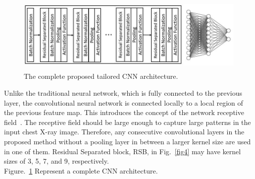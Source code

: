 \begin{figure}
    \begin{center}
    \includegraphics[height=37mm,width=14.0cm]{Figures/fig5.jpg}
    \caption{The complete proposed tailored CNN architecture.}
    \label{fig52}
    \end{center}
    \end{figure}
    
Unlike the traditional neural network, which is fully connected to the previous layer, the convolutional neural network is connected locally to a local region of the previous feature map. This introduces the concept of the network receptive field~\cite{luo2016understanding}. The receptive field should be large enough to capture large patterns in the input chest X-ray image. Therefore, any consecutive convolutional layers in the proposed method without a pooling layer in between a larger kernel size are used in one of them. Residual Separated block, RSB, in Fig.~\ref{fig4} may have kernel sizes of 3, 5, 7, and 9, respectively.\\
Figure.~\ref{fig52} Represent a complete CNN architecture.



